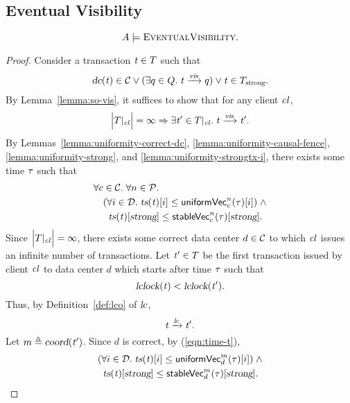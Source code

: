 
\subsection{Eventual Visibility} \label{ss:ev}

\begin{apptheorem} \label{thm:ev}
  \[
    A \models \textsc{EventualVisibility}.
  \]
\end{apptheorem}

\begin{proof} \label{proof:ev}
  Consider a transaction $\mathit{t} \in T$ such that
  \begin{align*}
    \textsl{dc}(\mathit{t}) \in \mathcal{C} \lor (\exists q \in Q.\; \mathit{t} \xrightarrow{\textsl{vis}} q)
    \lor \mathit{t} \in T_{\textsl{strong}}.
  \end{align*}
  By Lemma~\ref{lemma:so-vis},
  it suffices to show that for any client $\mathit{cl}$,
  \[
    \Big\lvert \txs|_{\cl} \Big\rvert = \infty
      \implies \exists \tvar' \in \txs|_{\cl}.\; \tvar \rel{\vis} \tvar'.
  \]
  By Lemmas~\ref{lemma:uniformity-correct-dc},
  \ref{lemma:uniformity-causal-fence}, \ref{lemma:uniformity-strong},
  and \ref{lemma:uniformity-strongtx-i},
  there exists some time $\tau$ such that
  \begin{align}
    &\forall c \in \mathcal{C}.\; \forall n \in \mathcal{P}. \nonumber\\
      &\quad (\forall i \in \mathcal{D}.\; \textsl{ts}(\mathit{t})[i]
        \le {\sf uniformVec}^{n}_{c}(\tau)[i])
      \;\land \nonumber\\
      &\quad\;\; \textsl{ts}(\mathit{t})[\textsl{strong}]
        \le {\sf stableVec}^{n}_{c}(\tau)[\textsl{strong}].
    \label{eqn:time-t}
  \end{align}
  Since $\Big\lvert T|_{\mathit{cl}} \Big\rvert = \infty$,
  there exists some correct data center $d \in \mathcal{C}$
  to which $\mathit{cl}$ issues an infinite number of transactions.
  Let $\mathit{t}' \in T$ be the first transaction
  issued by client $\mathit{cl}$ to data center $d$
  which starts after time $\tau$ such that
  \[
    \textsl{lclock}(\mathit{t}) < \textsl{lclock}(\mathit{t}').
  \]
  Thus, by Definition~\ref{def:lco} of $\textsl{lc}$,
  \[
    \mathit{t} \xrightarrow{\textsl{lc}} \mathit{t}'.
  \]
  Let $m \triangleq \textsl{coord}(\mathit{t}')$.
  Since $d$ is correct, by (\ref{eqn:time-t}),
  \begin{align*}
    &(\forall i \in \mathcal{D}.\; \textsl{ts}(\mathit{t})[i] \le {\sf uniformVec}^{m}_{d}(\tau)[i])
    \;\land \\
    &\;\;\textsl{ts}(\mathit{t})[\textsl{strong}] \le {\sf stableVec}^{m}_{d}(\tau)[\textsl{strong}].
  \end{align*}

\end{proof}
